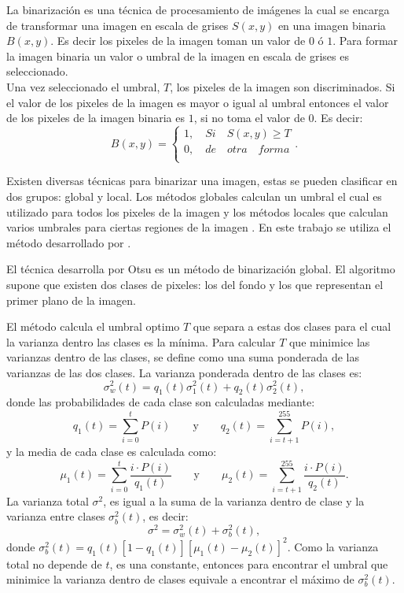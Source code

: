 La binarización es una técnica de procesamiento de imágenes la cual se encarga de transformar una imagen en escala de grises $S(x,y)$ en una imagen binaria $B(x,y)$. Es decir los pixeles de la imagen toman un valor de $0$ ó $1$. Para formar la imagen binaria un valor o umbral de la imagen en escala de grises es seleccionado. \\ 
Una vez seleccionado el umbral, $T$, los pixeles de la imagen son discriminados. Si el valor de los pixeles de la imagen es mayor o igual al umbral entonces el valor de los pixeles de la imagen binaria es $1$, si no toma el valor de $0$. Es decir: 
\begin{equation}
B(x,y)=
\begin{cases}   
1, \quad Si \quad S(x,y)\geq T \\
0, \quad de \quad otra \quad forma\\
\end{cases}.
\end{equation}

Existen diversas técnicas para binarizar una imagen, estas se pueden clasificar en dos grupos: global y local. Los métodos globales calculan un umbral el cual es utilizado para todos los pixeles de la imagen y los métodos locales que calculan varios umbrales para ciertas regiones de la imagen \citep{Chaki2014}.  En este trabajo se utiliza el método desarrollado por \citep{Otsu1979}.

El técnica desarrolla por Otsu es un método de binarizaci\'on global. El algoritmo supone que existen dos clases de pixeles: los del fondo y los que representan el primer plano de la imagen. 

El método calcula el umbral optimo $T$ que separa a estas dos clases para el cual la varianza dentro las clases es la mínima. Para calcular $T$ que minimice las varianzas dentro de las clases, se define como una suma ponderada de las varianzas de las dos clases.
La varianza ponderada dentro de las clases es: 
\begin{equation}
\sigma^2_w(t) = q_1(t)\sigma^2_1(t) + q_2(t)\sigma^2_2(t),
\end{equation} 
donde las probabilidades de cada clase son calculadas mediante:  
\begin{equation}
q_1(t) = \sum ^t_{i=0} P(i) 
\qquad \text{y} \qquad
q_2(t) = \sum ^{255}_{i=t+1} P(i),
\end{equation} 
y la media de cada clase es calculada como:  
\begin{equation}
\mu_1(t) = \sum ^t_{i=0} \frac{i \cdot P(i)}{q_1(t)} 
\qquad \text{y} \qquad
\mu_2(t) = \sum ^{255}_{i=t+1} \frac{i \cdot P(i)}{q_2(t)}.
\end{equation} 
La varianza total $\sigma^2$, es igual a la suma de la varianza dentro de clase y la varianza entre clases $\sigma^2_b(t)$, es decir: 
\begin{equation}
\sigma^2 = \sigma^2_w(t) + \sigma^2_b(t),
\end{equation}
donde $\sigma^2_b(t)= q_1(t)\left[ 1- q_1(t) \right]\left[ \mu_1(t) - \mu_2(t) \right]^2 .$  
Como la varianza total no depende de $t$, es una constante, entonces para encontrar el umbral que minimice la varianza dentro de clases equivale a encontrar el máximo de $\sigma^2_b(t)$. 

